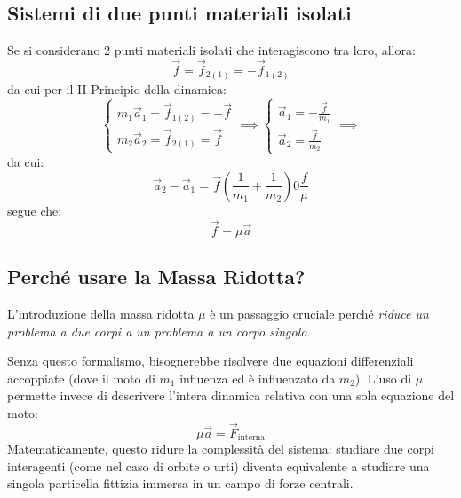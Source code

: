 \documentclass[11pt, a4paper, openright]{book}
\theoremstyle{plain}
\theoremstyle{definition}
\begin{document}
\subsection{Sistemi di due punti materiali isolati}
Se si considerano 2 punti materiali isolati che interagiscono tra loro, allora:
\begin{equation}
    \vec{f} = \vec{f}_{2(1)} = - \vec{f}_{1(2)}
\end{equation}
da cui per il II Principio della dinamica:
\begin{equation}
    \begin{cases}
        \displaystyle m_1\vec{a}_1 = \vec{f}_{1(2)} = - \vec{f} \\
        \displaystyle m_2\vec{a}_2 = \vec{f}_{2(1)} = \vec{f}
    \end{cases} \implies
    \begin{cases}
        \displaystyle \vec{a}_1 = - \frac{\vec{f}}{m_1} \\
        \displaystyle \vec{a}_2 = \frac{\vec{f}}{m_2}
    \end{cases} \implies
\end{equation}
da cui:
\begin{equation}
    \vec{a}_2 - \vec{a}_1 = \vec{f}(\frac{1}{m_1} + \frac{1}{m_2}) 0 \frac{f}{\mu}
\end{equation}
segue che:
\begin{equation}
    \vec{f} = \mu \vec{a}
\end{equation}

\subsection*{Perché usare la Massa Ridotta?}
L'introduzione della massa ridotta $\mu$ è un passaggio cruciale perché \textit{riduce un problema a due corpi a un problema a un corpo singolo}.

Senza questo formalismo, bisognerebbe risolvere due equazioni differenziali accoppiate (dove il moto di $m_1$ influenza ed è influenzato da $m_2$). L'uso di $\mu$ permette invece di descrivere l'intera dinamica relativa con una sola equazione del moto:
\begin{equation}
    \mu \vec{a} = \vec{F}_{\text{interna}}
\end{equation}
Matematicamente, questo ridure la complessità del sistema: studiare due corpi interagenti (come nel caso di orbite o urti) diventa equivalente a studiare una singola particella fittizia immersa in un campo di forze centrali.
\end{document}
